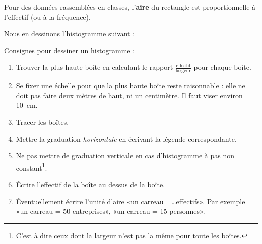 \begin{Aretenir}
Pour des données rassemblées en classes, l'\textbf{aire} du rectangle est proportionnelle à l'effectif (ou à la fréquence). 
\end{Aretenir}

Nous en dessinons l'histogramme suivant :
\begin{center}
   
\end{center}


Consignes pour dessiner un histogramme :
\begin{enumerate}
    \item
        Trouver la plus haute boîte en calculant le rapport \( \frac{ \text{effectif} }{ \text{largeur} }\) pour chaque boîte.
    \item
        Se fixer une échelle pour que la plus haute boîte reste raisonnable : elle ne doit pas faire deux mètres de haut, ni un centimètre. Il faut viser environ \SI{10}{\centi\meter}.
    \item
        Tracer les boîtes.
    \item
        Mettre la graduation \emph{horizontale} en écrivant la légende correspondante.
    \item
        Ne pas mettre de graduation verticale en cas d'histogramme à pas non constant\footnote{C'est à dire ceux dont la largeur n'est pas la même pour toute les boîtes.}.
    \item
        Écrire l'effectif de la boîte au dessus de la boîte.
    \item
        Éventuellement écrire l'unité d'aire «un carreau= \ldots effectifs». Par exemple «un carreau = 50 entreprises», «un carreau = 15 personnes».
\end{enumerate}



